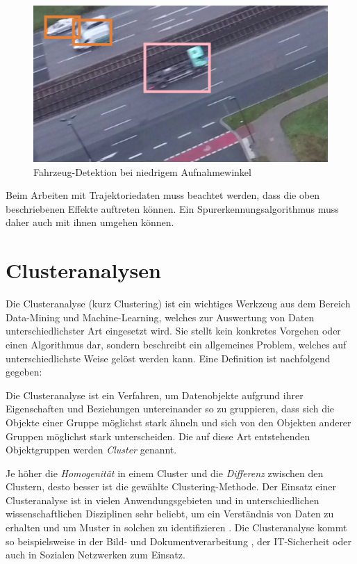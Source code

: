 \begin{figure}[H]
    \centering
    \includegraphics[width=0.45\linewidth]{resources/img/grundlagen/TrajectoryReconstruction/challenges/low_angle}
    \caption{Fahrzeug-Detektion bei niedrigem Aufnahmewinkel}
    \label{fig:grund_low_angle_detection}
\end{figure}

Beim Arbeiten mit Trajektoriedaten muss beachtet werden, dass die oben beschriebenen Effekte auftreten
können. Ein Spurerkennungsalgorithmus muss daher auch mit ihnen umgehen können.



\chapter{Clusteranalysen}
\label{sec:tra_clustering}

Die Clusteranalyse (kurz Clustering) ist ein wichtiges Werkzeug aus dem Bereich Data-Mining und Machine-Learning,
welches zur Auswertung von Daten unterschiedlichster Art eingesetzt wird.
Sie stellt kein konkretes Vorgehen oder einen Algorithmus dar, sondern beschreibt ein
allgemeines Problem, welches auf unterschiedlichste Weise gelöst werden kann. Eine Definition ist nachfolgend
gegeben:

\begin{theorem}[Clusteranalyse]
    Die Clusteranalyse ist ein Verfahren, um Datenobjekte aufgrund ihrer Eigenschaften und Beziehungen
    untereinander so zu gruppieren, dass sich die Objekte einer Gruppe möglichst stark ähneln und sich
    von den Objekten anderer Gruppen möglichst stark unterscheiden. Die auf diese Art entstehenden
    Objektgruppen werden \textit{Cluster} genannt.
\end{theorem}

Je höher die \textit{Homogenität} in einem Cluster
und die \textit{Differenz} zwischen den Clustern, desto besser ist die gewählte Clustering-Methode.
Der Einsatz einer Clusteranalyse ist in vielen Anwendungsgebieten und in unterschiedlichen wissenschaftlichen
Disziplinen sehr beliebt, um ein Verständnis von Daten zu erhalten und um Muster in solchen zu identifizieren \cite[]{tan2007introduction}.
Die Clusteranalyse kommt so beispielsweise in der Bild- \cite[]{Pappas1992} und Dokumentverarbeitung \cite[]{Hammouda2004},
der IT-Sicherheit \cite[]{Portnoy2001} oder auch in Sozialen Netzwerken \cite[]{Handcock2007} zum Einsatz.

